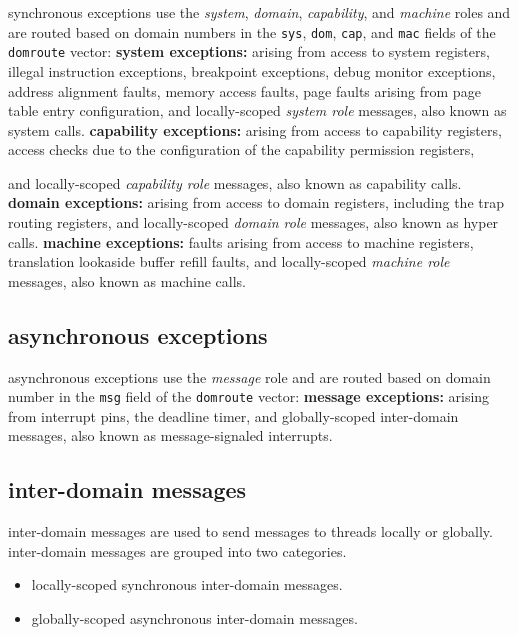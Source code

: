 synchronous exceptions use the \emph{system}, \emph{domain},
\emph{capability}, and \emph{machine} roles and are routed based on
domain numbers in the \texttt{sys}, \texttt{dom}, \texttt{cap}, and
\texttt{mac} fields of the \texttt{domroute} vector:
\para
\textbf{system exceptions:}
arising from access to system registers, illegal instruction
exceptions, breakpoint exceptions, debug monitor exceptions,
address alignment faults, memory access faults, page faults arising
from page table entry configuration, and locally-scoped
\emph{system role} messages, also known as system calls.
\para
\textbf{capability exceptions:}
arising from access to capability registers, access checks due
to the configuration of the capability permission registers,

and locally-scoped \emph{capability role} messages, also known as
capability calls.
\para
\textbf{domain exceptions:}
arising from access to domain registers, including the trap routing
registers, and locally-scoped \emph{domain role} messages, also known
as hyper calls.
\para
\textbf{machine exceptions:}
faults arising from access to machine registers, translation lookaside
buffer refill faults, and locally-scoped \emph{machine role} messages,
also known as machine calls.

\subsection{asynchronous exceptions}

asynchronous exceptions use the \emph{message} role and are
routed based on domain number in the \texttt{msg} field of the
\texttt{domroute} vector:
\para
\textbf{message exceptions:}
arising from interrupt pins, the deadline timer, and
globally-scoped inter-domain messages, also known as message-signaled
interrupts.

\newpage
\subsection{inter-domain messages}

inter-domain messages are used to send messages to threads locally
or globally. inter-domain messages are grouped into two categories.

\begin{itemize}[itemsep=0pt]
\item locally-scoped synchronous inter-domain messages.
\item globally-scoped asynchronous inter-domain messages.
\end{itemize}


